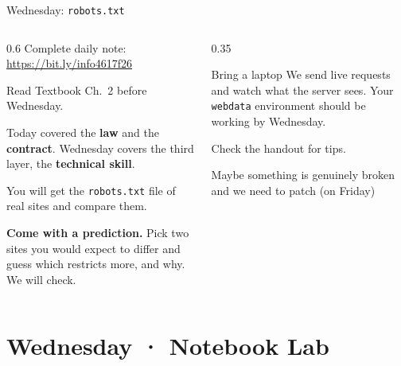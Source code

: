 \documentclass[9pt,aspectratio=169]{beamer}
\begin{document}
\begin{frame}{Wednesday: \texttt{robots.txt}}
    \begin{columns}[T]
        \begin{column}{0.6\textwidth}
            Complete daily note: \url{https://bit.ly/info4617f26}

            \medskip
            Read Textbook Ch.~2 before Wednesday.

            \medskip
            Today covered the \textbf{law} and the \textbf{contract}. Wednesday covers the third layer, the \textbf{technical skill}.

            \medskip

            You will get the \texttt{robots.txt} file of real sites and compare them.

            \medskip

            \textbf{Come with a prediction.} Pick two sites you would expect to differ and guess which restricts more, and why. We will check.
        \end{column}
        \begin{column}{0.35\textwidth}\small
            \begin{alertblock}{Bring a laptop}
                We send live requests and watch what the server sees. Your \texttt{webdata} environment should be working by Wednesday.

                \medskip
                Check the handout for tips. 
                
                \medskip
                Maybe something is genuinely broken and we need to patch (on Friday)
            \end{alertblock}
        \end{column}
    \end{columns}
\end{frame}

\section{Wednesday · Notebook Lab}
\end{document}
